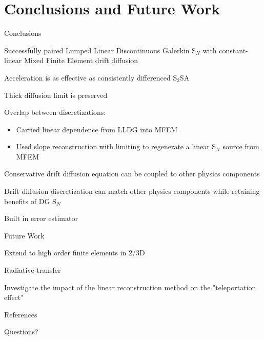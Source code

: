 \documentclass[10pt]{beamer}
\newcommand{\SN}{S$_N$\xspace}
\begin{document}
\section{Conclusions and Future Work }

\begin{frame}{Conclusions}

	Successfully paired Lumped Linear Discontinuous Galerkin \SN with constant-linear Mixed Finite Element drift diffusion 

	Acceleration is as effective as consistently differenced S$_2$SA 

	Thick diffusion limit is preserved 

	Overlap between discretizations:
	\begin{itemize}
		\item Carried linear dependence from LLDG into MFEM 

		\item Used slope reconstruction with limiting to regenerate a linear \SN source from MFEM 

	\end{itemize}

	Conservative drift diffusion equation can be coupled to other physics components

	Drift diffusion discretization can match other physics components while retaining benefits of DG \SN 

	Built in error estimator 

\end{frame}

\begin{frame}{Future Work}

	Extend to high order finite elements in 2/3D 

	Radiative transfer 

	Investigate the impact of the linear reconstruction method on the "teleportation effect"

\end{frame}


\appendix

\begin{frame}[allowframebreaks]{References}

	\nocite{*}
	
	

\end{frame}

\begin{frame}[standout]
  Questions?
\end{frame}
\end{document}
